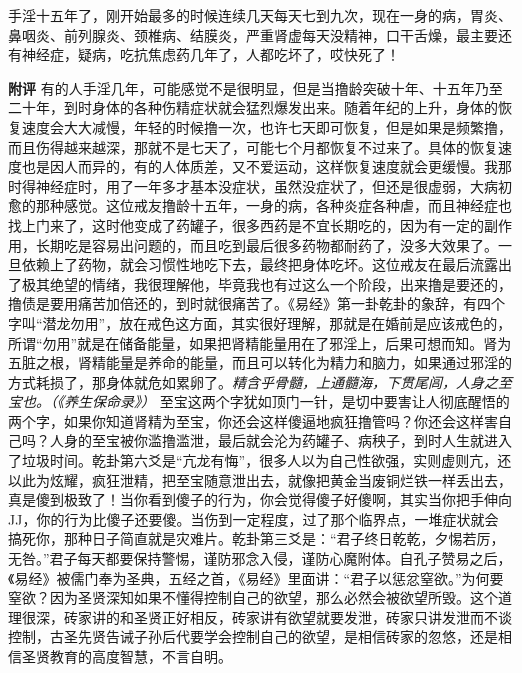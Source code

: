 \begin{case}
    手淫十五年了，刚开始最多的时候连续几天每天七到九次，现在一身的病，胃炎、鼻咽炎、前列腺炎、颈椎病、结膜炎，严重肾虚每天没精神，口干舌燥，最主要还有神经症，疑病，吃抗焦虑药几年了，人都吃坏了，哎快死了！

    \textbf{附评} 有的人手淫几年，可能感觉不是很明显，但是当撸龄突破十年、十五年乃至二十年，到时身体的各种伤精症状就会猛烈爆发出来。随着年纪的上升，身体的恢复速度会大大减慢，年轻的时候撸一次，也许七天即可恢复，但是如果是频繁撸，而且伤得越来越深，那就不是七天了，可能七个月都恢复不过来了。具体的恢复速度也是因人而异的，有的人体质差，又不爱运动，这样恢复速度就会更缓慢。我那时得神经症时，用了一年多才基本没症状，虽然没症状了，但还是很虚弱，大病初愈的那种感觉。这位戒友撸龄十五年，一身的病，各种炎症各种虐，而且神经症也找上门来了，这时他变成了药罐子，很多西药是不宜长期吃的，因为有一定的副作用，长期吃是容易出问题的，而且吃到最后很多药物都耐药了，没多大效果了。一旦依赖上了药物，就会习惯性地吃下去，最终把身体吃坏。这位戒友在最后流露出了极其绝望的情绪，我很理解他，毕竟我也有过这么一个阶段，出来撸是要还的，撸债是要用痛苦加倍还的，到时就很痛苦了。《易经》第一卦乾卦的象辞，有四个字叫“潜龙勿用”，放在戒色这方面，其实很好理解，那就是在婚前是应该戒色的，所谓“勿用”就是在储备能量，如果把肾精能量用在了邪淫上，后果可想而知。肾为五脏之根，肾精能量是养命的能量，而且可以转化为精力和脑力，如果通过邪淫的方式耗损了，那身体就危如累卵了。\textit{精含乎骨髓，上通髓海，下贯尾闾，人身之至宝也。（《养生保命录》）} 至宝这两个字犹如顶门一针，是切中要害让人彻底醒悟的两个字，如果你知道肾精为至宝，你还会这样傻逼地疯狂撸管吗？你还会这样害自己吗？人身的至宝被你滥撸滥泄，最后就会沦为药罐子、病秧子，到时人生就进入了垃圾时间。乾卦第六爻是“亢龙有悔”，很多人以为自己性欲强，实则虚则亢，还以此为炫耀，疯狂泄精，把至宝随意泄出去，就像把黄金当废铜烂铁一样丢出去，真是傻到极致了！当你看到傻子的行为，你会觉得傻子好傻啊，其实当你把手伸向 JJ，你的行为比傻子还要傻。当伤到一定程度，过了那个临界点，一堆症状就会搞死你，那种日子简直就是灾难片。乾卦第三爻是：“君子终日乾乾，夕惕若厉，无咎。”君子每天都要保持警惕，谨防邪念入侵，谨防心魔附体。自孔子赞易之后，《易经》被儒门奉为圣典，五经之首，《易经》里面讲：“君子以惩忿窒欲。”为何要窒欲？因为圣贤深知如果不懂得控制自己的欲望，那么必然会被欲望所毁。这个道理很深，砖家讲的和圣贤正好相反，砖家讲有欲望就要发泄，砖家只讲发泄而不谈控制，古圣先贤告诫子孙后代要学会控制自己的欲望，是相信砖家的忽悠，还是相信圣贤教育的高度智慧，不言自明。
\end{case}

